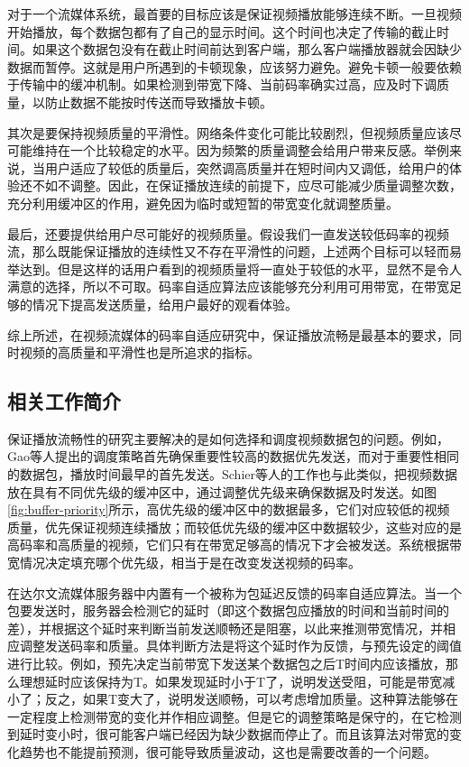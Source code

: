 对于一个流媒体系统，最首要的目标应该是保证视频播放能够连续不断。一旦视频开始播放，每个数据包都有了自己的显示时间。这个时间也决定了传输的截止时间。如果这个数据包没有在截止时间前达到客户端，那么客户端播放器就会因缺少数据而暂停。这就是用户所遇到的卡顿现象，应该努力避免。避免卡顿一般要依赖于传输中的缓冲机制。如果检测到带宽下降、当前码率确实过高，应及时下调质量，以防止数据不能按时传送而导致播放卡顿。

其次是要保持视频质量的平滑性。网络条件变化可能比较剧烈，但视频质量应该尽可能维持在一个比较稳定的水平。因为频繁的质量调整会给用户带来反感。举例来说，当用户适应了较低的质量后，突然调高质量并在短时间内又调低，给用户的体验还不如不调整。因此，在保证播放连续的前提下，应尽可能减少质量调整次数，充分利用缓冲区的作用，避免因为临时或短暂的带宽变化就调整质量。

最后，还要提供给用户尽可能好的视频质量。假设我们一直发送较低码率的视频流，那么既能保证播放的连续性又不存在平滑性的问题，上述两个目标可以轻而易举达到。但是这样的话用户看到的视频质量将一直处于较低的水平，显然不是令人满意的选择，所以不可取。码率自适应算法应该能够充分利用可用带宽，在带宽足够的情况下提高发送质量，给用户最好的观看体验。

综上所述，在视频流媒体的码率自适应研究中，保证播放流畅是最基本的要求，同时视频的高质量和平滑性也是所追求的指标。

\subsection{相关工作简介}

保证播放流畅性的研究主要解决的是如何选择和调度视频数据包的问题。例如，Gao等人\supercite{Gao2006}提出的调度策略首先确保重要性较高的数据优先发送，而对于重要性相同的数据包，播放时间最早的首先发送。Schier等人的工作\supercite{Schierl2010}也与此类似，把视频数据放在具有不同优先级的缓冲区中，通过调整优先级来确保数据及时发送。如图\ref{fig:buffer-priority}\supercite{Schierl2010}所示，高优先级的缓冲区中的数据最多，它们对应较低的视频质量，优先保证视频连续播放；而较低优先级的缓冲区中数据较少，这些对应的是高码率和高质量的视频，它们只有在带宽足够高的情况下才会被发送。系统根据带宽情况决定填充哪个优先级，相当于是在改变发送视频的码率。

在达尔文流媒体服务器中内置有一个被称为包延迟反馈的码率自适应算法。当一个包要发送时，服务器会检测它的延时（即这个数据包应播放的时间和当前时间的差），并根据这个延时来判断当前发送顺畅还是阻塞，以此来推测带宽情况，并相应调整发送码率和质量。具体判断方法是将这个延时作为反馈，与预先设定的阈值进行比较。例如，预先决定当前带宽下发送某个数据包之后T时间内应该播放，那么理想延时应该保持为T。如果发现延时小于T了，说明发送受阻，可能是带宽减小了；反之，如果T变大了，说明发送顺畅，可以考虑增加质量。这种算法能够在一定程度上检测带宽的变化并作相应调整。但是它的调整策略是保守的，在它检测到延时变小时，很可能客户端已经因为缺少数据而停止了。而且该算法对带宽的变化趋势也不能提前预测，很可能导致质量波动，这也是需要改善的一个问题。

